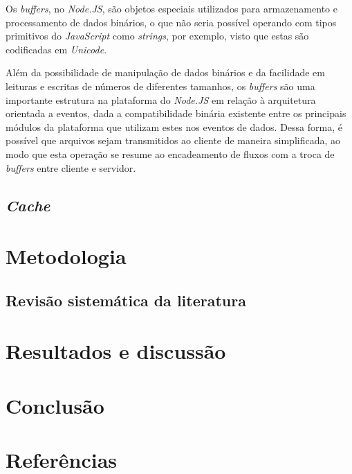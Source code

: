 \documentclass[12pt]{article}
\begin{document}
Os \textit{buffers}, no \textit{Node.JS}, são objetos especiais utilizados para armazenamento e processamento 
de dados binários, o que não seria possível operando com tipos primitivos do \textit{JavaScript} como \textit{strings},
por exemplo, visto que estas são codificadas em \textit{Unicode}. \cite[p. 29]{DIOGORESENDE}

Além da possibilidade de manipulação de dados binários e da facilidade em leituras e escritas de números de diferentes 
tamanhos, os \textit{buffers} são uma importante estrutura na plataforma do \textit{Node.JS} em relação à arquitetura
orientada a eventos, dada a compatibilidade binária existente entre os principais módulos da plataforma que 
utilizam estes nos eventos de dados. Dessa forma, é possível que arquivos sejam transmitidos ao cliente de maneira 
simplificada, ao modo que esta operação se resume ao encadeamento de fluxos com a troca de 
\textit{buffers} entre cliente e servidor. \cite[p. 29]{DIOGORESENDE}


\subsection{\textit{Cache}}



\section{Metodologia}

\subsection{Revisão sistemática da literatura}


\section{Resultados e discussão}


\section{Conclusão}


\section{Referências}


\end{document}
